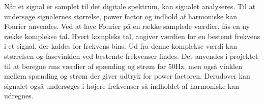 Når et signal er samplet til det digitale spektrum, kan signalet analyseres. Til at undersøge signalernes størrelse, power factor og indhold af harmoniske kan Fourier anvendes. Ved at lave Fourier på en række samplede værdier, fås en ny række komplekse tal. Hvert kompleks tal, angiver værdien for en bestemt frekvens i et signal, der kaldes for frekvens bins. Ud fra denne komplekse værdi kan størrelsen og fasevinklen ved bestemte frekvenser findes. Det anvendes i projektet til at beregne rms værdier af spænding og strøm for 50Hz, men også vinklen mellem spænding og strøm der giver udtryk for power factoren. Derudover kan signalet også undersøges i højere frekvenser så indholdet af harmoniske kan udregnes.  

